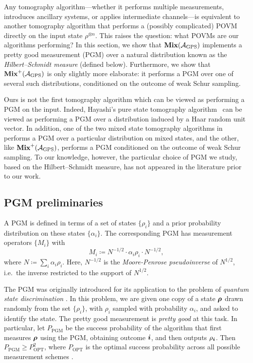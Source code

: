 Any tomography algorithm---whether it performs multiple measurements, introduces ancillary systems, or applies intermediate channels---is equivalent to another tomography algorithm that performs a (possibly complicated) POVM directly on the input state $\rho^{\otimes n}$.
This raises the question: what POVMs are our algorithms performing? In this section, we show that $\textup{\textbf{Mix}}(\mathcal{A}_{\mathrm{GPS}})$ implements a pretty good measurement (PGM) over a natural distribution known as the \emph{Hilbert--Schmidt measure} (defined below). Furthermore, we show that $\textup{\textbf{Mix}}^+(\mathcal{A}_{\mathrm{GPS}})$ is only slightly more elaborate: it performs a PGM over one of several such distributions, conditioned on the outcome of weak Schur sampling. 

Ours is not the first tomography algorithm which can be viewed as performing a PGM on the input.
Indeed, Hayashi's pure state tomography algorithm~\cite{Hay98} can be viewed as performing a PGM over a distribution induced by a Haar random unit vector. 
In addition, one of the two mixed state tomography algorithms in~\cite{HHJ+16} performs a PGM over a particular distribution on mixed states,
and the other, like $\textup{\textbf{Mix}}^+(\mathcal{A}_{\mathrm{GPS}})$, performs a PGM conditioned on the outcome of weak Schur sampling.
To our knowledge, however, the particular choice of PGM we study, based on the Hilbert--Schmidt measure, has not appeared in the literature prior to our work.

\subsection{PGM preliminaries} A PGM is defined in terms of a set of states $\{\rho_i\}$ and a prior probability distribution on these states $\{\alpha_i\}$. The corresponding PGM has measurement operators $\{M_i\}$ with 
\begin{equation*}
    M_i \coloneq N^{-1/2} \cdot \alpha_i \rho_i \cdot N^{-1/2},
\end{equation*}
where $N \coloneq \sum_{i} \alpha_i \rho_i$. Here, $N^{-1/2}$ is the \emph{Moore-Penrose pseudoinverse} of $N^{1/2}$, i.e.\ the inverse restricted to the support of $N^{1/2}$. 

The PGM was originally introduced for its application to the problem of \emph{quantum state discrimination} \cite{Bel75,Hol79,HW94}. In this problem, we are given one copy of a state $\boldsymbol{\rho}$ drawn randomly from the set $\{\rho_i\}$, with $\rho_i$ sampled with probability $\alpha_i$, and asked to identify the state. The pretty good measurement is \emph{pretty good} at this task. In particular, let $P_\mathrm{PGM}$ be the success probability of the algorithm that first measures $\boldsymbol{\rho}$ using the PGM, obtaining outcome $\boldsymbol{i}$, and then outputs $\rho_{\boldsymbol{i}}$. Then $P_{\mathrm{PGM}} \geq P_{\mathrm{OPT}}^2$, where $P_{\mathrm{OPT}}$ is the optimal success probability across all possible measurement schemes \cite{BK02}.

